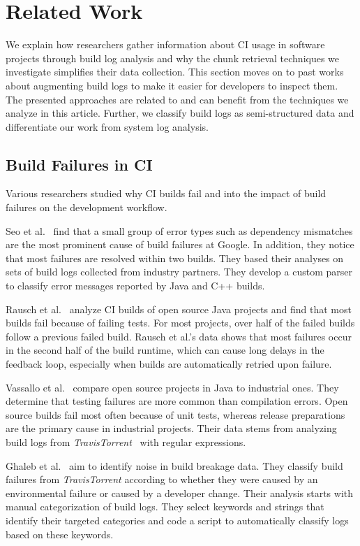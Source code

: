 \section{Related Work}
\label{sec:rw}
We explain how researchers gather information about CI usage in software
projects
through build log analysis and why the chunk retrieval techniques we
investigate
simplifies their data collection.
This section moves on to past works about augmenting build logs to make
it easier
for developers to inspect them.
The presented approaches are related to and can benefit from the
techniques we
analyze in this article.
Further, we classify build logs as semi-structured data and differentiate
our
work from system log analysis.

\subsection{Build Failures in CI}
Various researchers studied why CI builds fail and into the impact of
build failures on the development workflow.

Seo et al.~\cite{seo2014programmers} find that a small group of error
types such as dependency mismatches are the most prominent cause of
build failures at Google.
In addition, they notice that most failures
are resolved within two builds.
They based their analyses on sets of
build logs collected from industry partners.
They develop a custom
parser to classify error messages reported by Java and C++ builds.

Rausch et al.~\cite{rausch2017empirical} analyze CI builds of open
source Java projects and find that most builds fail because of failing
tests.
For most projects, over half of the failed builds follow a
previous failed build.
Rausch et al.'s data shows that most failures
occur in the second half of the build runtime, which can cause long
delays in the feedback loop, especially when builds are automatically
retried upon failure.

Vassallo et al.~\cite{vassallo2017a-tale} compare open source projects
in Java to industrial ones.
They determine that testing failures are
more common than compilation errors.
Open source builds fail most
often because of unit tests, whereas release preparations are the
primary cause in industrial projects.
Their data stems from analyzing
build logs from \emph{TravisTorrent}~\cite{beller2017travistorrent}
with regular expressions.

Ghaleb et al.~\cite{ghaleb2019studying} aim to identify noise in build
breakage data.
They classify build failures from \emph{TravisTorrent}
according to whether they were caused by an environmental failure or
caused by a developer change.
Their analysis starts with manual
categorization of build logs.
They select keywords and strings that
identify their targeted categories and code a script to automatically
classify logs based on these keywords.


